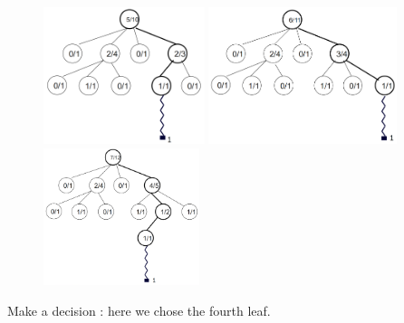 \begin{figure}[H]
\centering
	\begin{minipage}[b]{0.33\linewidth}
	\centering
		\includegraphics[height=4cm]{1_Presentation/1.2_Algorithm_MCTS_Benoit/img/10.png}
	\end{minipage}%
	\begin{minipage}[b]{0.33\linewidth}
	\centering
		\includegraphics[height=4cm]{1_Presentation/1.2_Algorithm_MCTS_Benoit/img/11.png}
	\end{minipage}%
	\begin{minipage}[b]{0.33\linewidth}
	\centering
		\includegraphics[height=4cm]{1_Presentation/1.2_Algorithm_MCTS_Benoit/img/12.png}
	\end{minipage}%
\end{figure}
\noindent
Make a decision : here we chose the fourth leaf.\\
\bigskip

